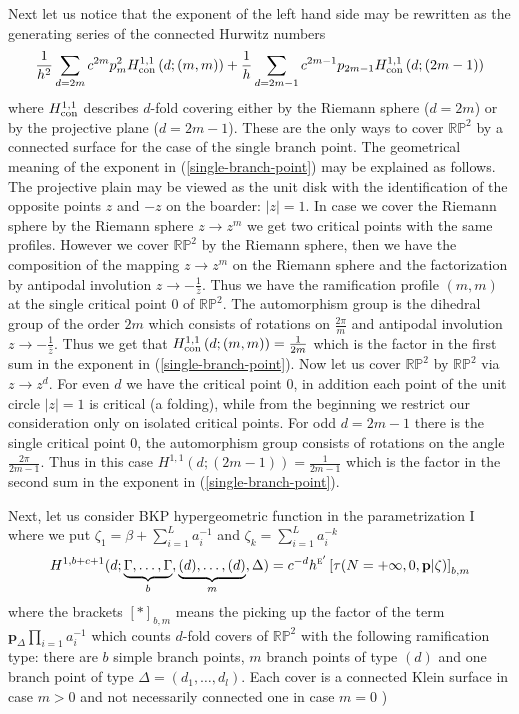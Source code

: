 \documentclass[a4paper,10pt]{article}
\newcommand{\bpow}{\mathbf{p}}
\theoremstyle{plain}
\theoremstyle{remark}
\def\be{\begin{equation}}
\def\ee{\end{equation}}
\begin{document}
Next let us notice that the exponent of the left hand side may be rewritten as the generating series of the
connected Hurwitz numbers
\[
 \frac{1}{h^2}\sum_{d=2m}c^{2m} p_m^2 H_{\rm con}^{1,1}\left(d;(m,m)\right) +
 \frac{1}{h} \sum_{d=2m-1} c^{2m-1}p_{2m-1} H_{\rm con}^{1,1}\left(d;(2m-1)\right)
\]
where $H_{{\rm con}}^{1,1}$ describes $d$-fold covering either by the Riemann
sphere ($d=2m$) or by the projective plane ($d=2m-1$). These are the only ways to cover $\mathbb{RP}^2$
by a connected surface for the case of the single branch point.
The geometrical meaning of the exponent in (\ref{single-branch-point}) may be explained as follows. The projective plain may be viewed as the unit disk with the identification
of the opposite points $z$ and $-z$ on the boarder: $|z|=1$. In case we cover the Riemann sphere by the Riemann sphere $z\to z^m$ we get
two critical points with the same profiles. However we cover $\mathbb{RP}^2$ by the Riemann sphere, then we have the composition of the
mapping $z\to z^{m}$ on the
Riemann sphere and the factorization by antipodal involution $z\to - \frac{1}{\bar z}$. Thus we have the ramification profile $(m,m)$
at the single critical point $0$ of $\mathbb{RP}^2$.
The automorphism group is the dihedral group of the order $2m$ which consists of rotations on $\frac{2\pi }{m}$ and antipodal involution
$z\to -\frac{1}{\bar z}$.
Thus we get that $H_{\rm con}^{1,1}\left(d;(m,m)\right)=\frac{1}{2m}$ which is the factor in the first sum in the exponent in
(\ref{single-branch-point}). Now let us cover $\mathbb{RP}^2$ by $\mathbb{RP}^2$ via $z\to z^d$. For even $d$ we have the critical point
$0$, in addition each point of the unit
circle $|z|=1$ is critical (a folding), while from the beginning we restrict our consideration only on isolated critical points.
For odd $d=2m-1$ there is
the single critical point $0$, the automorphism group consists of rotations on the angle $\frac{2\pi}{2m-1}$. Thus in this case
$H^{1,1}\left(d;(2m-1)\right)=\frac{1}{2m-1}$ which is the factor in the second sum in the exponent in (\ref{single-branch-point}).

Next, let us consider BKP hypergeometric function in the parametrization I where we put
$\zeta_1=\beta +\sum_{i=1}^L a_i^{-1} $ and $\zeta_k=\sum_{i=1}^L a_i^{-k} $
\be\label{tau-Hurwitz-themselves}
H^{1,b+c+1}(d; \underbrace{\Gamma,\dots,\Gamma}_b,\underbrace{(d),\dots,(d)}_m,\Delta )= c^{-d}h^{\textsc{e}'}
\left[ \tau(N=+\infty,0,\bpow|\zeta) \right]_{b,m}
\ee
where the brackets $[*]_{b,m}$ means the picking up the factor of the term $\bpow_\Delta \prod_{i=1} a_i^{-1}$
which counts $d$-fold covers of $\mathbb{RP}^2$ with the following ramification type: there are $b$ simple branch points,
$m$ branch points of type $(d)$ and one branch point of type $\Delta=(d_1,\dots,d_l)$. Each cover is a
connected Klein surface in case $m>0$ and
not necessarily connected one in case $m=0$ )
\end{document}
